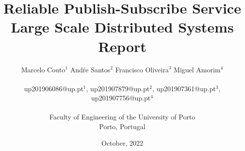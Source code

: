 \documentclass[a4paper, 10pt, twocolumn]{article}
\date{October, 2022}
\begin{document}
\linespread{0.5}

\title{\textbf{Reliable Publish-Subscribe Service}\\[1mm] Large Scale Distributed Systems Report}

\author{Marcelo Couto$^1$   Andŕe Santos$^2$   Francisco Oliveira$^3$ Miguel Amorim$^4$\\ \\ 
up201906086@up.pt$^1$, up201907879@up.pt$^2$, up201907361@up.pt$^3$, up201907756@up.pt$^4$ \\ \\ 
Faculty of Engineering of the University of Porto \\ 
Porto, Portugal}



\maketitle 
\pagestyle{fancy}
\fancyhf{}
\fancyfoot[C]{\thepage}









\end{document}
